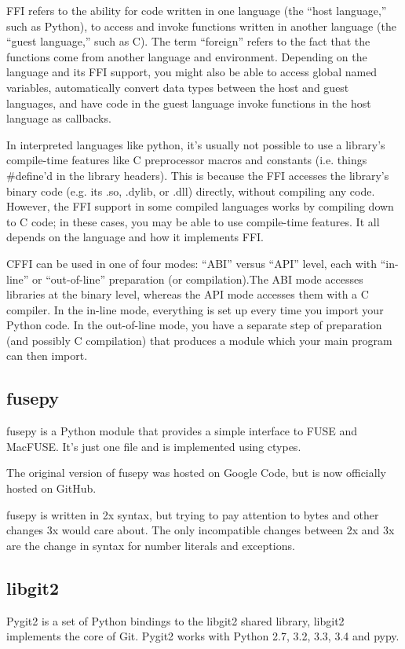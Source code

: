         FFI refers to the ability for code written in one language (the “host language,” such as Python), to access and invoke functions written in another language (the “guest language,” such as C). The term “foreign” refers to the fact that the functions come from another language and environment.
        Depending on the language and its FFI support, you might also be able to access global named variables, automatically convert data types between the host and guest languages, and have code in the guest language invoke functions in the host language as callbacks.
        
        In interpreted languages like python, it’s usually not possible to use a library’s compile-time features like C preprocessor macros and constants (i.e. things \#define’d in the library headers). This is because the FFI accesses the library’s binary code (e.g. its .so, .dylib, or .dll) directly, without compiling any code.
        However, the FFI support in some compiled languages works by compiling down to C code; in these cases, you may be able to use compile-time features. It all depends on the language and how it implements FFI.
        
        CFFI can be used in one of four modes: “ABI” versus “API” level, each with “in-line” or “out-of-line” preparation (or compilation).The ABI mode accesses libraries at the binary level, whereas the API mode accesses them with a C compiler.
        In the in-line mode, everything is set up every time you import your Python code. In the out-of-line mode, you have a separate step of preparation (and possibly C compilation) that produces a module which your main program can then import.
    \subsection{fusepy}
        fusepy is a Python module that provides a simple interface to FUSE and MacFUSE. It's just one file and is implemented using ctypes.

        The original version of fusepy was hosted on Google Code, but is now officially hosted on GitHub.
       
        fusepy is written in 2x syntax, but trying to pay attention to bytes and other changes 3x would care about. The only incompatible changes between 2x and 3x are the change in syntax for number literals and exceptions.
    \subsection{libgit2}
        Pygit2 is a set of Python bindings to the libgit2 shared library, libgit2 implements the core of Git. Pygit2 works with Python 2.7, 3.2, 3.3, 3.4 and pypy.
    
